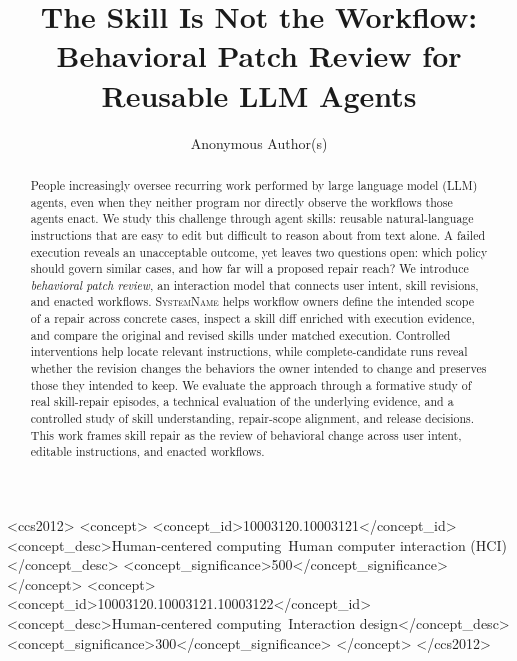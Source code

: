 \documentclass[sigconf]{acmart}
\providecommand{\systemname}{\textsc{SystemName}}
\begin{document}
\title{The Skill Is Not the Workflow: Behavioral Patch Review for Reusable LLM Agents}

\author{Anonymous Author(s)}
\renewcommand{\shortauthors}{Anonymous Author(s)}

\begin{abstract}
People increasingly oversee recurring work performed by large language model (LLM) agents, even when they neither program nor directly observe the workflows those agents enact. We study this challenge through agent skills: reusable natural-language instructions that are easy to edit but difficult to reason about from text alone. A failed execution reveals an unacceptable outcome, yet leaves two questions open: which policy should govern similar cases, and how far will a proposed repair reach? We introduce \emph{behavioral patch review}, an interaction model that connects user intent, skill revisions, and enacted workflows. \systemname{} helps workflow owners define the intended scope of a repair across concrete cases, inspect a skill diff enriched with execution evidence, and compare the original and revised skills under matched execution. Controlled interventions help locate relevant instructions, while complete-candidate runs reveal whether the revision changes the behaviors the owner intended to change and preserves those they intended to keep. We evaluate the approach through a formative study of real skill-repair episodes, a technical evaluation of the underlying evidence, and a controlled study of skill understanding, repair-scope alignment, and release decisions. This work frames skill repair as the review of behavioral change across user intent, editable instructions, and enacted workflows.
\end{abstract}

\begin{CCSXML}
<ccs2012>
 <concept>
  <concept_id>10003120.10003121</concept_id>
  <concept_desc>Human-centered computing~Human computer interaction (HCI)</concept_desc>
  <concept_significance>500</concept_significance>
 </concept>
 <concept>
  <concept_id>10003120.10003121.10003122</concept_id>
  <concept_desc>Human-centered computing~Interaction design</concept_desc>
  <concept_significance>300</concept_significance>
 </concept>
</ccs2012>
\end{CCSXML}

\end{document}
